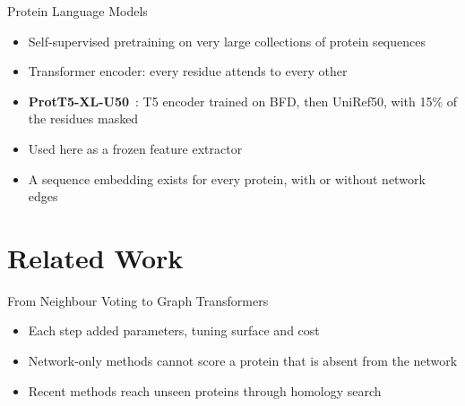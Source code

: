 \documentclass[aspectratio=169,11pt]{beamer}
\begin{document}
\begin{frame}{Protein Language Models}
  \begin{itemize}\setlength{\itemsep}{0.5em}
    \item Self-supervised pretraining on very large collections of protein sequences
    \item Transformer encoder: every residue attends to every other
    \item \textbf{ProtT5-XL-U50}~\cite{elnaggar2021prottrans}: T5 encoder trained on BFD, then UniRef50, with 15\% of
      the residues masked
    \item Used here as a \alert{frozen} feature extractor
    \item A sequence embedding exists for every protein, with or without network edges
  \end{itemize}
\end{frame}

\section{Related Work}

\begin{frame}{From Neighbour Voting to Graph Transformers}
  \begin{center}
  \end{center}
  \vspace{0.3em}
  \begin{itemize}\setlength{\itemsep}{0.4em}
    \item Each step added parameters, tuning surface and cost
    \item Network-only methods cannot score a protein that is absent from the network
    \item Recent methods reach unseen proteins through homology search
  \end{itemize}
\end{frame}
\end{document}
